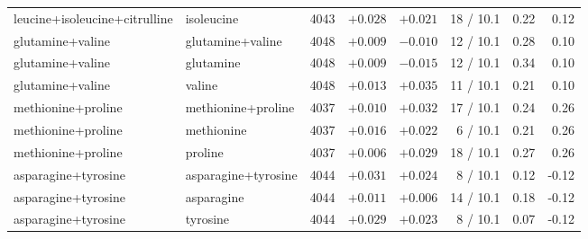 \begin{table}[H]
\begin{tabular}{@{}llrrrrrr@{}}
    leucine+isoleucine+citrulline & isoleucine & 4043 & $+0.028$ & $+0.021$ & 18 / 10.1 & 0.22 & 0.12 \\
    glutamine+valine & glutamine+valine & 4048 & $+0.009$ & $-0.010$ & 12 / 10.1 & 0.28 & 0.10 \\
    glutamine+valine & glutamine & 4048 & $+0.009$ & $-0.015$ & 12 / 10.1 & 0.34 & 0.10 \\
    glutamine+valine & valine & 4048 & $+0.013$ & $+0.035$ & 11 / 10.1 & 0.21 & 0.10 \\
    methionine+proline & methionine+proline & 4037 & $+0.010$ & $+0.032$ & 17 / 10.1 & 0.24 & 0.26 \\
    methionine+proline & methionine & 4037 & $+0.016$ & $+0.022$ & 6 / 10.1 & 0.21 & 0.26 \\
    methionine+proline & proline & 4037 & $+0.006$ & $+0.029$ & 18 / 10.1 & 0.27 & 0.26 \\
    asparagine+tyrosine & asparagine+tyrosine & 4044 & $+0.031$ & $+0.024$ & 8 / 10.1 & 0.12 & -0.12 \\
    asparagine+tyrosine & asparagine & 4044 & $+0.011$ & $+0.006$ & 14 / 10.1 & 0.18 & -0.12 \\
    asparagine+tyrosine & tyrosine & 4044 & $+0.029$ & $+0.023$ & 8 / 10.1 & 0.07 & -0.12 \\
    \hline
  \end{tabular}
\end{table}
